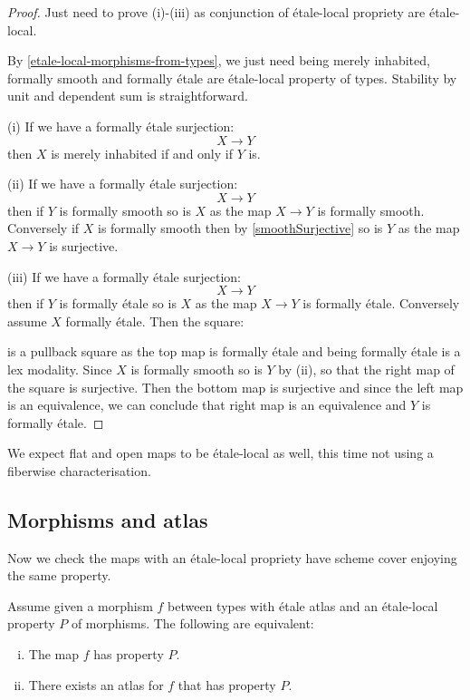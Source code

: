 \begin{proof}
Just need to prove (i)-(iii) as conjunction of étale-local propriety are étale-local.

By \cref{etale-local-morphisms-from-types}, we just need being merely inhabited, formally smooth and formally étale are étale-local property of types. Stability by unit and dependent sum is straightforward.

(i) If we have a formally étale surjection: 
\[X\to Y\]
then $X$ is merely inhabited if and only if $Y$ is.

(ii) If we have a formally étale surjection: 
\[X\to Y\]
then if $Y$ is formally smooth so is $X$ as the map $X\to Y$ is formally smooth. Conversely if $X$ is formally smooth then by \cref{smoothSurjective} so is $Y$ as the map $X\to Y$ is surjective.

(iii) If we have a formally étale surjection: 
\[X\to Y\]
then if $Y$ is formally étale so is $X$ as the map $X\to Y$ is formally étale. Conversely assume $X$ formally étale. Then the square:
    \begin{center}
  \end{center}
  is a pullback square as the top map is formally étale and being formally étale is a lex modality. Since $X$ is formally smooth so is $Y$ by (ii), so that the right map of the square is surjective. Then the bottom map is surjective and since the left map is an equivalence, we can conclude that right map is an equivalence and $Y$ is formally étale.
\end{proof}

\begin{remark}
We expect flat and open maps to be étale-local as well, this time not using a fiberwise characterisation.
\end{remark}

\subsection{Morphisms and atlas}

Now we check the maps with an étale-local propriety have scheme cover enjoying the same property.

\begin{lemma}\label{scheme-replacement-nice-maps}
Assume given a morphism $f$ between types with étale atlas and an étale-local property $P$ of morphisms. The following are equivalent:
\begin{enumerate}[(i)]
\item The map $f$ has property $P$. 
\item There exists an atlas for $f$ that has property $P$.
\end{enumerate}
\end{lemma}

